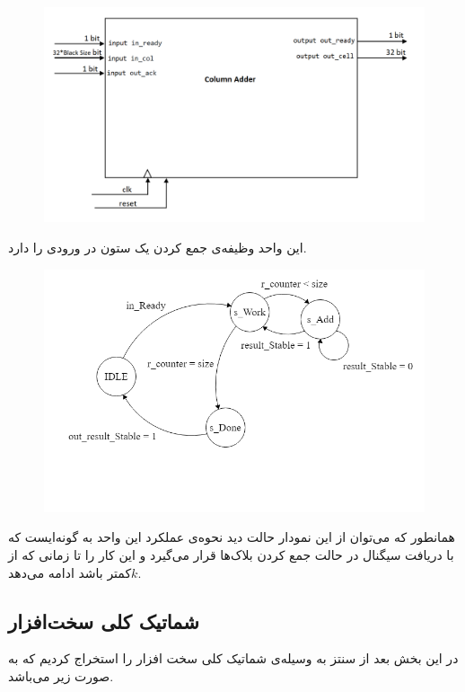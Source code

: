 \documentclass[12pt,onecolumn,a4paper,fleqn]{article}
\begin{document}
\begin{itemize}
	\begin{figure}[h]
	\centering
	\includegraphics[trim={0 2cm 0 0}, clip, width=0.7 \linewidth]{source/columnAdder.png}
	\caption{}
	
\end{figure}

این واحد وظیفه‌ی جمع کردن یک ستون در ورودی را دارد.

	\begin{figure}[h]
	\centering
	\includegraphics[trim={0 2cm 0 0}, clip, width=0.7 \linewidth]{source/column_adder.png}
	\caption{}
	
\end{figure}

همانطور که می‌توان از این نمودار حالت دید نحوه‌ی عملکرد این واحد به گونه‌ایست که با دریافت سیگنال  در حالت جمع کردن بلاک‌ها قرار می‌گیرد و این کار را تا زمانی که  از $k$کمتر باشد ادامه می‌دهد.
	
\end{itemize}

\pagebreak

\subsection{شماتیک کلی سخت‌افزار}

در این بخش بعد از سنتز به وسیله‌ی   شماتیک کلی سخت ‌‌افزار را استخراج کردیم که به صورت زیر می‌باشد.
\end{document}
